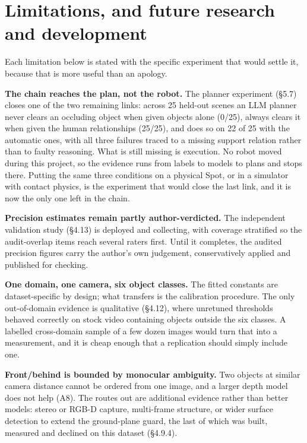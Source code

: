\section{Limitations, and future research and development}

Each limitation below is stated with the specific experiment that would settle it, because that is more useful than an apology.

\textbf{The chain reaches the plan, not the robot.} The planner experiment (\S5.7) closes one of the two remaining links: across 25 held-out scenes an LLM planner never clears an occluding object when given objects alone (0/25), always clears it when given the human relationships (25/25), and does so on 22 of 25 with the automatic ones, with all three failures traced to a missing support relation rather than to faulty reasoning. What is still missing is execution. No robot moved during this project, so the evidence runs from labels to models to plans and stops there. Putting the same three conditions on a physical Spot, or in a simulator with contact physics, is the experiment that would close the last link, and it is now the only one left in the chain.

\textbf{Precision estimates remain partly author-verdicted.} The independent validation study (\S4.13) is deployed and collecting, with coverage stratified so the audit-overlap items reach several raters first. Until it completes, the audited precision figures carry the author's own judgement, conservatively applied and published for checking.

\textbf{One domain, one camera, six object classes.} The fitted constants are dataset-specific by design; what transfers is the calibration procedure. The only out-of-domain evidence is qualitative (\S4.12), where unretuned thresholds behaved correctly on stock video containing objects outside the six classes. A labelled cross-domain sample of a few dozen images would turn that into a measurement, and it is cheap enough that a replication should simply include one.

\textbf{Front/behind is bounded by monocular ambiguity.} Two objects at similar camera distance cannot be ordered from one image, and a larger depth model does not help (A8). The routes out are additional evidence rather than better models: stereo or RGB-D capture, multi-frame structure, or wider surface detection to extend the ground-plane guard, the last of which was built, measured and declined on this dataset (\S4.9.4).

